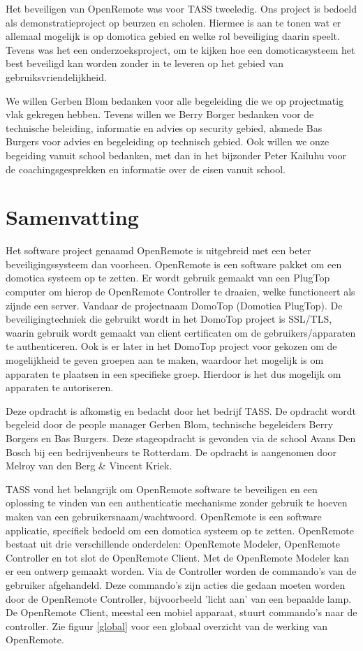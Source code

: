 \documentclass[]{article}
\begin{document}
Het beveiligen van OpenRemote was voor TASS tweeledig. Ons project is bedoeld als
demonstratieproject op beurzen en scholen. Hiermee is aan te tonen wat er
allemaal mogelijk is op domotica gebied en welke rol beveiliging daarin speelt.
Tevens was het een onderzoeksproject, om te kijken hoe een domoticasysteem
het best beveiligd kan worden zonder in te leveren op het gebied van
gebruiksvriendelijkheid.

We willen Gerben Blom bedanken voor alle begeleiding die we op projectmatig vlak
gekregen hebben. Tevens willen we Berry Borger bedanken voor de technische
beleiding, informatie en advies op security gebied, alsmede Bas Burgers voor advies en begeleiding op technisch gebied. Ook willen we onze
begeiding vanuit school bedanken, met dan in het bijzonder Peter Kailuhu voor
de coachingsgesprekken en informatie over de eisen vanuit school.

\newpage
\tableofcontents
\newpage
\listoftables
\listoffigures

\newpage
\section*{Samenvatting}
Het software project genaamd OpenRemote is uitgebreid met een beter
beveiligingssysteem dan voorheen. OpenRemote is een software
pakket om een domotica systeem op te zetten. Er wordt gebruik gemaakt van
een PlugTop computer om hierop de OpenRemote Controller te draaien, welke functioneert als
zijnde een server. Vandaar de projectnaam DomoTop (Domotica PlugTop).
De beveiligingtechniek die gebruikt wordt in het DomoTop project is SSL/TLS,
waarin gebruik wordt gemaakt van client certificaten om de
gebruikers/apparaten te authenticeren. Ook is er later in het DomoTop project
voor gekozen om de mogelijkheid te geven groepen aan te maken, waardoor
het mogelijk is om apparaten te plaatsen in een specifieke groep. Hierdoor
is het dus mogelijk om apparaten te autoriseren.

Deze opdracht is afkomstig en bedacht door het bedrijf TASS. De opdracht wordt
begeleid door de people manager Gerben Blom, technische begeleiders Berry
Borgers en Bas Burgers. Deze stageopdracht is gevonden via de school Avans Den
Bosch bij een bedrijvenbeurs te Rotterdam. De opdracht is aangenomen door
Melroy van den Berg \& Vincent Kriek.

TASS vond het belangrijk om OpenRemote software te beveiligen en een oplossing
te vinden van een authenticatie mechanisme zonder gebruik te hoeven maken van
een gebruikersnaam/wachtwoord. OpenRemote is een software
applicatie, specifiek bedoeld om een domotica systeem op te zetten. OpenRemote
bestaat uit drie verschillende onderdelen: OpenRemote Modeler, OpenRemote
Controller en tot slot de OpenRemote Client. Met de OpenRemote Modeler kan er een ontwerp
gemaakt worden. Via de Controller worden de commando's van de gebruiker
afgehandeld. Deze commando's zijn acties die gedaan moeten worden door de
OpenRemote Controller, bijvoorbeeld 'licht aan' van een bepaalde lamp. De OpenRemote Client, meestal een mobiel apparaat, stuurt
commando's naar de controller. Zie figuur \ref{global} voor een globaal overzicht van de
werking van OpenRemote.
\end{document}

